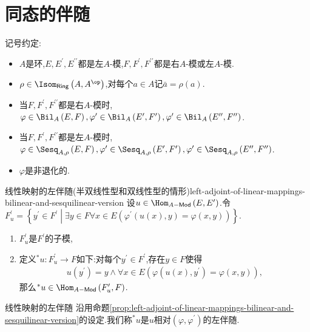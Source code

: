 \section{同态的伴随}

记号约定:
\begin{itemize}
	\item $A$是环,$E,E^{\prime},E^{\prime\prime}$都是左$A$-模,$F,F^{\prime},F^{\prime\prime}$都是右$A$-模或左$A$-模.
	\item $\rho\in\Isom_{\mathsf{Ring}}\left(A,A^{\op}\right)$,对每个$a\in A$记$\bar{a}=\rho\left(a\right)$.
	\item 当$F,F^{\prime},F^{\prime\prime}$都是右$A$-模时,$\varphi\in\Bil_{A}\left(E,F\right),\varphi^{\prime}\in\Bil_{A}\left(E^{\prime},F^{\prime}\right),\varphi^{\prime}\in\Bil_{A}\left(E^{\prime\prime},F^{\prime\prime}\right)$.
	\item 当$F,F^{\prime},F^{\prime\prime}$都是左$A$-模时,$\varphi\in\Sesq_{A,\rho}\left(E,F\right),\varphi^{\prime}\in\Sesq_{A,\rho}\left(E^{\prime},F^{\prime}\right),\varphi^{\prime}\in\Sesq_{A,\rho}\left(E^{\prime\prime},F^{\prime\prime}\right)$.
	\item $\varphi$是非退化的.
\end{itemize}

\begin{proposition}{线性映射的左伴随(半双线性型和双线性型的情形)}{left-adjoint-of-linear-mappings-bilinear-and-sesquilinear-version}
	设$u\in\Hom_{A-\mathsf{Mod}}\left(E,E^{\prime}\right)$.令$F_{u}^{\prime}=\left\{y^{\prime}\in F^{\prime}\middle|\exists y\in F\forall x\in E\left(\varphi^{\prime}\left(u\left(x\right),y\right)=\varphi\left(x,y\right)\right)\right\}$.
	\begin{enumerate}
		\item $F_{u}^{\prime}$是$F^{\prime}$的子模,
		\item 定义${}^{\ast}u:F_{u}^{\prime}\to F$如下:对每个$y^{\prime}\in F^{\prime}$,存在$y\in F$使得
		\begin{align*}
			u\left(y^{\prime}\right)=y\wedge\forall x\in E\left(\varphi\left(u\left(x\right),y^{\prime}\right)=\varphi\left(x,y\right)\right),
		\end{align*}
		那么${}^{\ast}u\in\Hom_{A-\mathsf{Mod}}\left(F_{u}^{\prime},F\right)$.
	\end{enumerate}
\end{proposition}

\begin{definition}{线性映射的左伴随}{}
	沿用命题\ref{prop:left-adjoint-of-linear-mappings-bilinear-and-sesquilinear-version}的设定.我们称${}^{\ast}u$是$u$相对$\left(\varphi,\varphi^{\prime}\right)$的左伴随.
\end{definition}

